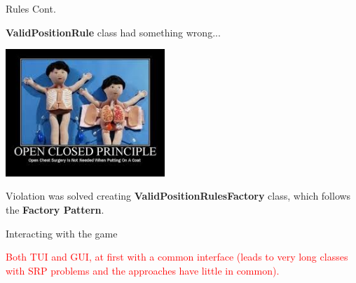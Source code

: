 \documentclass{beamer}
\begin{document}
  \begin{frame} {Rules Cont.}

    \textbf{ValidPositionRule} class had something wrong...

    \vspace{1em}


    \pause
    \hfill
    \includegraphics[width=0.45\textwidth]{img/openclosedprinciple.jpeg}

    \pause

    \vspace{1em}

    Violation was solved creating \textbf{ValidPositionRulesFactory} class, which follows the \textbf{Factory Pattern}.

  \end{frame}




  \begin{frame}{Interacting with the game}

    \textcolor{red}{Both TUI and GUI, at first with a common interface (leads to very long classes with SRP problems and the approaches have little in common).}

  \end{frame}
\end{document}
